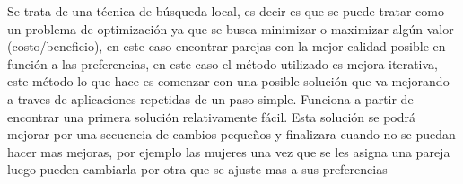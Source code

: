 \begin{enumerate}[a)]
  Se trata de una técnica de búsqueda local, es decir es que se puede tratar como un problema de optimización ya que se busca minimizar o maximizar algún valor (costo/beneficio), en este caso encontrar parejas con la mejor calidad posible en función a las preferencias, en este caso el método utilizado es mejora iterativa, este método lo que hace es comenzar con una posible solución que va mejorando a traves de aplicaciones repetidas de un paso simple. Funciona a partir de encontrar una primera solución relativamente fácil. Esta solución se podrá mejorar por una secuencia de cambios pequeños y finalizara cuando no se puedan hacer mas mejoras, por ejemplo las mujeres una vez que se les asigna una pareja luego pueden cambiarla por otra que se ajuste mas a sus preferencias
\end{enumerate}